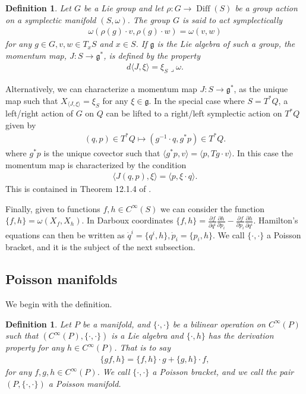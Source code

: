 \documentclass[12pt]{amsart}
\newcommand{\pder}[2]{\ensuremath{\frac{\partial #1}{\partial #2}}}
\newtheorem{defn}[thm]{Definition}
\DeclareMathOperator{\Diff}{Diff}
\begin{document}
\begin{defn}
  Let $G$ be a Lie group and let $\rho:G \to \Diff(S)$ be a group action on a symplectic manifold $(S,\omega)$.
  The group $G$ is said to \emph{act symplectically}
  \begin{align*}
    \omega( \rho( g ) \cdot v , \rho(g) \cdot w) = \omega(v,w)
  \end{align*}
  for any $g \in G, v,w \in T_xS$ and $x \in S$.
  If $\mathfrak{g}$ is the Lie algebra of such a group,
  the \emph{momentum map}, $J:S \to \mathfrak{g}^*$,
  is defined by the property
  \begin{align*}
    d \langle J , \xi \rangle = \xi_S \lrcorner \omega.
  \end{align*}
\end{defn}

Alternatively, we can characterize a momentum map $J: S \to \mathfrak{g}^*$, as the unique map such that $X_{\langle J , \xi \rangle} = \xi_S$ for any $\xi \in \mathfrak{g}$.
In the special case where $S = T^*Q$, a left/right action of $G$ on $Q$ can be lifted to a right/left symplectic action on $T^*Q$ given by
\begin{align*}
  (q,p) \in T^*Q \mapsto (g^{-1} \cdot q , g^* p) \in T^*Q.
\end{align*}
where $g^*p$ is the unique covector such that $\langle g^*p , v \rangle = \langle p , Tg \cdot v \rangle$.
In this case the momentum map is characterized by the condition
\begin{align}
  \langle J(q,p) , \xi \rangle = \langle p , \xi \cdot q \rangle.
  \label{eq:cotangent_momap}
\end{align}
This is contained in Theorem 12.1.4 of \cite{MandS}.

Finally, given to functions $f,h \in C^{\infty}(S)$ we can consider the function $\{ f,h\} = \omega( X_f, X_h)$.
In Darboux coordinates $\{ f , h \} = \pder{f}{q^i} \pder{h}{p_i} - \pder{f}{p_i} \pder{h}{q^i}$.
Hamilton's equations can then be written as $\dot{q}^i = \{ q^i , h \},
\dot{p}_i = \{ p_i , h \}$.
We call $\{ \cdot , \cdot \}$ a Poisson bracket, and it is the subject of
the next subsection.

\subsection{Poisson manifolds}
\label{sec:Poisson}
We begin with the definition.

\begin{defn} \label{defn:Poisson}
  Let $P$ be a manifold, and $\{ \cdot , \cdot \}$ be a bilinear
  operation on $C^{\infty}(P)$ such that 
  $( C^{\infty}(P) , \{ \cdot , \cdot \} )$ is a Lie algebra
  and $\{ \cdot , h \}$ has the derivation property for any $h \in C^{\infty}(P)$.
  That is to say
  \begin{align*}
    \{ gf , h \} = \{ f , h \} \cdot g + \{ g , h \} \cdot f,
  \end{align*}
  for any $f,g,h \in C^{\infty}(P)$.
  We call $\{ \cdot , \cdot \}$ a \emph{Poisson bracket},
  and we call the pair $(P, \{ \cdot , \cdot \})$ a Poisson manifold.
\end{defn}
\end{document}
